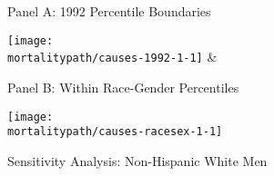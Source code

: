 \documentclass[12pt,letterpaper]{article}
\begin{document}
\begin{figure}[H]
  \caption{Sensitivity Analysis: Non-Hispanic White Men}
  \begin{center}
    \vspace{-.6cm}
    Panel A: 1992 Percentile Boundaries
  \end{center}
  \vspace{-1.4cm}
  \begin{center}
    \texttt{[image: \\mortalitypath/causes-1992-1-1]} &
  \end{center}

  \begin{center}
    \vspace{-.6cm}
    Panel B: Within Race-Gender Percentiles
  \end{center}
  \vspace{-1.4cm}
  \begin{center}
    \texttt{[image: \\mortalitypath/causes-racesex-1-1]} \\
  \end{center}
\end{figure}
\end{document}
